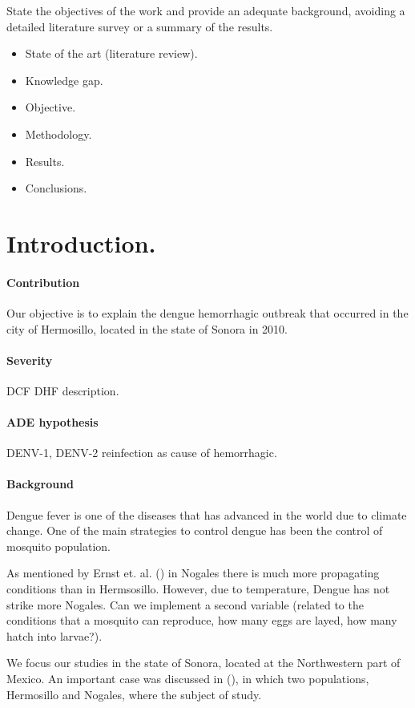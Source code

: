 State the objectives of the work and provide an adequate 
background, avoiding a detailed literature survey or a 
summary of the results.
\begin{itemize}
	\item
    	State of the art (literature review).
    \item	
    	Knowledge gap.
    \item	
    	Objective.
    \item
    	Methodology.
    \item	
    	Results.
    \item
    	Conclusions.
\end{itemize}

\section{Introduction.}\label{intro}
\paragraph{Contribution}
Our objective is to explain the dengue hemorrhagic outbreak that 
occurred in the city of Hermosillo, located in the state of Sonora in 2010.
\paragraph{Severity}
\ac{DCF} 
\ac{DHF} description.
\paragraph{ADE hypothesis}
\ac{DENV-1}, \ac{DENV-2}
reinfection as cause of hemorrhagic.
\paragraph{Background}

	Dengue fever is one of the diseases that has advanced in the 
world due to climate change. One of the main strategies to control dengue has been the control of mosquito population.

	As mentioned by Ernst et. al. (\cite{Ernst2016}) in Nogales there 
is much more propagating conditions than in Hermsosillo. However, 
due to temperature, Dengue has not strike more Nogales. Can we 
implement a second variable (related to the conditions that a 
mosquito can reproduce, how many eggs are layed, how many hatch into larvae?).

\noindent We focus our studies in the state of Sonora, located at the Northwestern part of Mexico. An important case was discussed in (\cite{Ernst2016}), in which two populations, Hermosillo and Nogales, where the subject of study.

